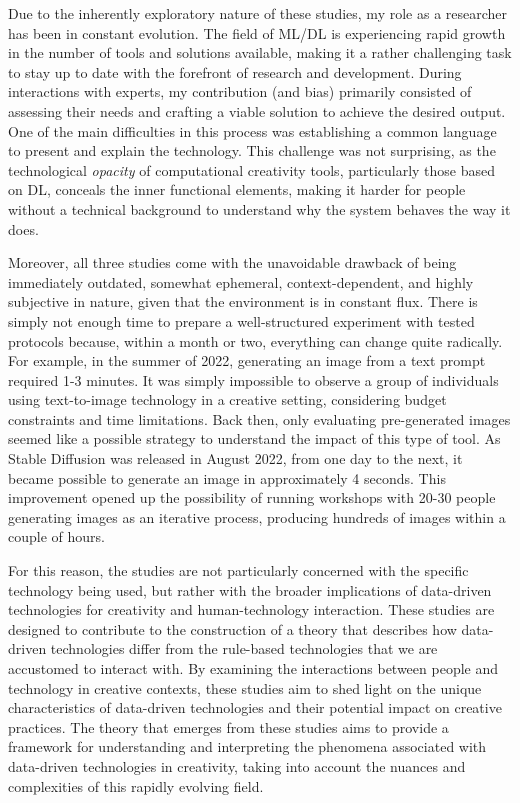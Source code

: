 Due to the inherently exploratory nature of these studies, my role as a researcher has been in constant evolution. The field of ML/DL is experiencing rapid growth in the number of tools and solutions available, making it a rather challenging task to stay up to date with the forefront of research and development. During interactions with experts, my contribution (and bias) primarily consisted of assessing their needs and crafting a viable solution to achieve the desired output. One of the main difficulties in this process was establishing a common language to present and explain the technology. This challenge was not surprising, as the technological \emph{opacity} of computational creativity tools, particularly those based on DL, conceals the inner functional elements, making it harder for people without a technical background to understand why the system behaves the way it does.

Moreover, all three studies come with the unavoidable drawback of being immediately outdated, somewhat ephemeral, context-dependent, and highly subjective in nature, given that the environment is in constant flux. There is simply not enough time to prepare a well-structured experiment with tested protocols because, within a month or two, everything can change quite radically. For example, in the summer of 2022, generating an image from a text prompt required 1-3 minutes. It was simply impossible to observe a group of individuals using text-to-image technology in a creative setting, considering budget constraints and time limitations. Back then, only evaluating pre-generated images seemed like a possible strategy to understand the impact of this type of tool. As Stable Diffusion was released in August 2022, from one day to the next, it became possible to generate an image in approximately 4 seconds. This improvement opened up the possibility of running workshops with 20-30 people generating images as an iterative process, producing hundreds of images within a couple of hours.

For this reason, the studies are not particularly concerned with the specific technology being used, but rather with the broader implications of data-driven technologies for creativity and human-technology interaction. These studies are designed to contribute to the construction of a theory that describes how data-driven technologies differ from the rule-based technologies that we are accustomed to interact with. By examining the interactions between people and technology in creative contexts, these studies aim to shed light on the unique characteristics of data-driven technologies and their potential impact on creative practices. The theory that emerges from these studies aims to provide a framework for understanding and interpreting the phenomena associated with data-driven technologies in creativity, taking into account the nuances and complexities of this rapidly evolving field.
